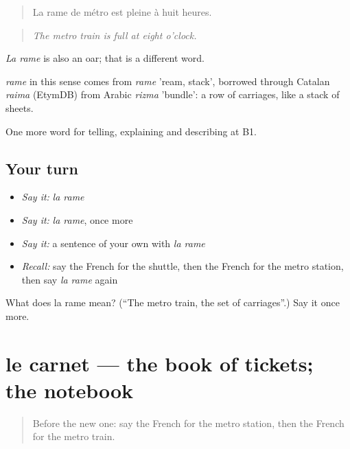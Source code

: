 \begin{quote}
La rame de métro est pleine à huit heures.
\end{quote}

\begin{quote}
\emph{The metro train is full at eight o'clock.}
\end{quote}

\emph{La rame} is also an oar; that is a different word.

\begin{cousinweb}
\emph{rame} in this sense comes from \emph{rame} 'ream, stack', borrowed through Catalan \emph{raima} (EtymDB) from Arabic \emph{rizma} 'bundle': a row of carriages, like a stack of sheets.
\end{cousinweb}

\begin{grammarlens}[title={What you've built}]
One more word for telling, explaining and describing at B1.
\end{grammarlens}

\subsection*{Your turn}
\begin{itemize}
\raggedright
  \item \emph{Say it:} \emph{la rame}
  \item \emph{Say it:} \emph{la rame}, once more
  \item \emph{Say it:} a sentence of your own with \emph{la rame}
  \item \emph{Recall:} say the French for the shuttle, then the French for the metro station, then say \emph{la rame} again
\end{itemize}

\begin{tcolorbox}[breakable,colback=teal!4,colframe=teal!35!black,title={Before you move on}]
What does la rame mean? (\textquotedblleft{}The metro train, the set of carriages\textquotedblright{}.) Say it once more.
\end{tcolorbox}
\section[le carnet]{le carnet — the book of tickets; the notebook}

\label{lesson:FR-C415-carnet}



\begin{quote}
Before the new one: say the French for the metro station, then the French for the metro train.
\end{quote}

